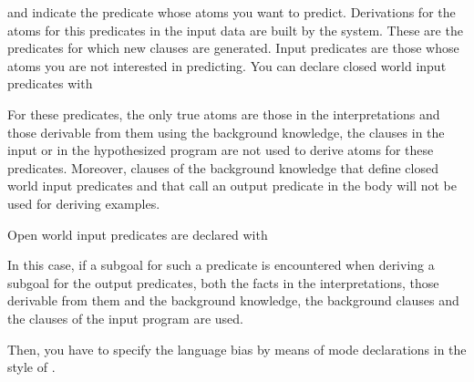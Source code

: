 \documentclass[letterpaper,10pt,english]{sphinxmanual}
\begin{document}
and indicate the predicate whose atoms you want to predict.
Derivations for the atoms for this predicates in the input data are built by the system.
These are the predicates for which new clauses are generated.
Input predicates are those whose atoms you are not interested in predicting.
You can declare closed world input predicates with

\begin{sphinxVerbatim}[commandchars=\\\{\}]
\end{sphinxVerbatim}

For these predicates, the only true atoms are those in the interpretations and those derivable from them using the background knowledge, the clauses in the input or in the hypothesized program are not used to derive atoms for these predicates. Moreover, clauses of the background knowledge that define closed world input predicates and that call an output predicate in the body will not be used for deriving examples.

Open world input predicates are declared with

\begin{sphinxVerbatim}[commandchars=\\\{\}]
\end{sphinxVerbatim}

In this case, if a subgoal for such a predicate is encountered when deriving a subgoal for the output predicates, both the facts in the interpretations, those derivable from them and the background knowledge, the background clauses and the clauses of the input program are used.

Then, you have to specify the language bias by means of mode declarations in the style of .

\begin{sphinxVerbatim}[commandchars=\\\{\}]
\end{sphinxVerbatim}
\end{document}
